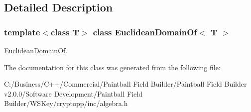 \subsection{Detailed Description}
\subsubsection*{template$<$class T$>$ class EuclideanDomainOf$<$ T $>$}

\hyperlink{class_euclidean_domain_of}{EuclideanDomainOf}. 

The documentation for this class was generated from the following file:\begin{DoxyCompactItemize}
\item 
C:/Business/C++/Commercial/Paintball Field Builder/Paintball Field Builder v2.0.0/Software Development/Paintball Field Builder/WSKey/cryptopp/inc/algebra.h\end{DoxyCompactItemize}
